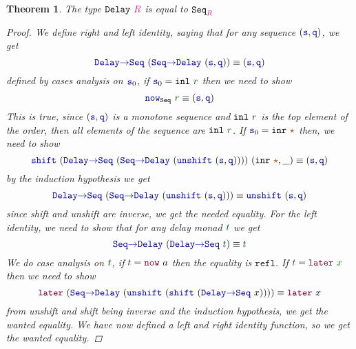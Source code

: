 \documentclass[twoside,11pt,openright]{report}
\theoremstyle{plain} %
\newtheorem{thm}{Theorem}[section]
\theoremstyle{definition}
\theoremstyle{remark}
\newcommand*{\term}[1]{\textcolor{green!30!black}{#1}} %
\newcommand*{\type}[1]{\textcolor{magenta!90!black}{#1}}
\newcommand*{\constant}[1]{\textcolor{orange!60!black}{\ensuremath{\mathtt{#1}}}}
\newcommand*{\function}[1]{\textcolor{blue!60!black}{\ensuremath{\mathtt{#1}}}}
\newcommand*{\constructor}[1]{\textcolor{purple!60!black}{\ensuremath{\mathtt{#1}}}}
\newcommand*{\typeformer}[1]{\ensuremath{\mathtt{#1}}}
\newcommand*{\unitelem}{\constant{\star}} %
\begin{document}
\begin{thm}
  \label{thm:seq-eq-delay}
  The type \(\typeformer{Delay}~\type{R}\) is equal to \(\typeformer{Seq}_{\type{R}}\)
  \begin{proof}  
    We define right and left identity, saying that for any sequence \((\function{s},\function{q})\), we get
    \begin{equation}
      \function{Delay{\rightarrow}Seq}~(\function{Seq{\rightarrow}Delay}~(\function{s},\function{q})) \equiv (\function{s},\function{q})
    \end{equation}
    defined by cases analysis on \(\function{s}_0\), if \(\function{s}_0 = \mathtt{inl}~\term{r}\) then we need to show
    \begin{equation}
      \function{now}_{\typeformer{Seq}}~\term{r} \equiv (\function{s},\function{q})
    \end{equation}
    This is true, since \((\function{s},\function{q})\) is a monotone sequence and \(\mathtt{inl}~\term{r}\) is the top element of the order, then all elements of the sequence are \(\mathtt{inl}~\term{r}\). If \(\function{s}_0 = \mathtt{inr}~\unitelem\) then, we need to show
    \begin{equation}
      \function{shift}~(\function{Delay{\rightarrow}Seq}~(\function{Seq{\rightarrow}Delay}~(\function{unshift}~(\function{s},\function{q}))))~(\mathtt{inr}~\unitelem,\_) \equiv (\function{s},\function{q})
    \end{equation}
    by the induction hypothesis we get
    \begin{equation}
      \function{Delay{\rightarrow}Seq}~(\function{Seq{\rightarrow}Delay}~(\function{unshift}~(\function{s},\function{q}))) \equiv \function{unshift}~(\function{s},\function{q})
    \end{equation}
    since shift and unshift are inverse, we get the needed equality. For the left identity, we need to show that for any delay monad \(\term{t}\) we get
    \begin{equation}
      \function{Seq{\rightarrow}Delay}~(\function{Delay{\rightarrow}Seq}~\term{t}) \equiv \term{t}
    \end{equation}
    We do case analysis on \(\term{t}\), if \(\term{t} = \constructor{now}~a\) then the equality is \(\mathtt{refl}\). If \(\term{t} = \constructor{later}~\term{x}\) then we need to show
    \begin{equation}
      \constructor{later}~(\function{Seq{\rightarrow}Delay}~(\function{unshift}~(\function{shift}~(\function{Delay{\rightarrow}Seq}~x)))) \equiv \constructor{later}~x
    \end{equation}
    from unshift and shift being inverse and the induction hypothesis, we get the wanted equality. We have now defined a left and right identity function, so we get the wanted equality.
  \end{proof}
\end{thm}
\end{document}
